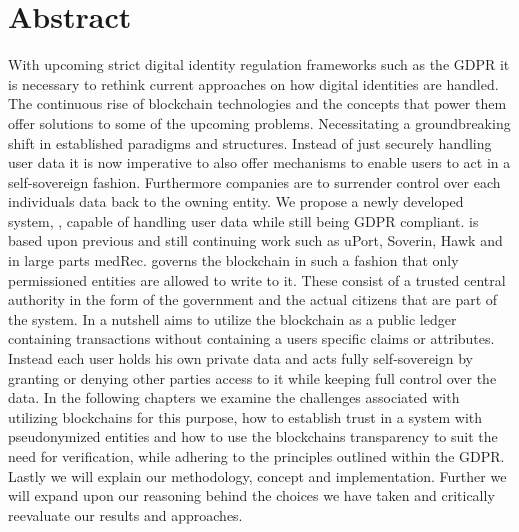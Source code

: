 \chapter*{Abstract}
\label{cha:abstract}

With upcoming strict digital identity regulation frameworks such as the GDPR\cite{gdpr} it is necessary to 
rethink current approaches on how digital identities are handled.
The continuous rise of blockchain technologies and the concepts that power
them offer solutions to some of the upcoming problems.
Necessitating a groundbreaking shift in established paradigms and structures.
Instead of just securely handling user data it is now imperative to also offer mechanisms to enable users to act
in a self-sovereign fashion.
Furthermore companies are to surrender control over each individuals data back to the owning entity.
We propose a newly developed system, \projectName{}, capable of handling user data while still being GDPR compliant.
\projectName{} is based upon previous and still continuing work such as uPort\cite{uPortWhitePaper},
Soverin\cite{soverin}, Hawk\cite{Hawk} and in large parts medRec\cite{azaria2016medrec}.
\projectName{} governs the blockchain in such a fashion that only permissioned entities are allowed to write to it.
These consist of a trusted central authority in the form of the government and the actual citizens
that are part of the system.
In a nutshell \projectName{} aims to utilize the blockchain as a public ledger containing transactions without
containing a users specific claims or attributes.
Instead each user holds his own private data and acts fully self-sovereign by granting or denying other parties access
to it while keeping full control over the data.
In the following chapters we examine the challenges associated with utilizing blockchains for this purpose,
how to establish trust in a system with pseudonymized entities and how to use the blockchains transparency to suit the
need for verification, while adhering to the principles outlined within the GDPR\cite{gdpr}.
Lastly we will explain our methodology, concept and implementation.
Further we will expand upon our reasoning behind the choices we have taken and critically reevaluate our results and approaches.
